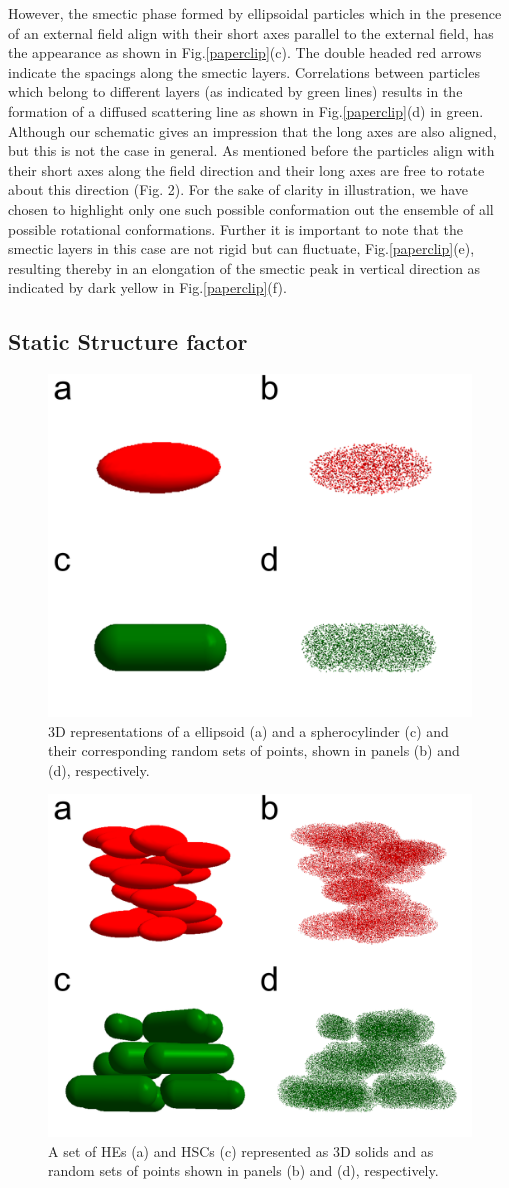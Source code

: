 \documentclass[aip,graphicx]{revtex4-1} %
\begin{document}
However, the smectic phase formed by ellipsoidal particles which in the presence of an external field align with their short axes parallel to the external
field, has the appearance as shown in Fig.\ref{paperclip}(c). The double headed red arrows indicate the spacings along the smectic layers. Correlations between
particles which belong to different layers (as indicated by green lines) results in the formation of a diffused scattering line as shown in
Fig.\ref{paperclip}(d) in green. Although our schematic gives an impression that the long axes are also aligned, but this is not the case in general. As
mentioned before the particles align with their short axes along the field direction and their long axes are free to rotate about this direction (Fig. 2). For
the sake of clarity in illustration, we have chosen to
highlight only one such possible conformation out the ensemble of all possible rotational conformations. Further it is important to note that the smectic layers
in this case are not rigid but can fluctuate, Fig.\ref{paperclip}(e), resulting thereby in an elongation of the smectic peak in vertical direction as indicated
by dark yellow in Fig.\ref{paperclip}(f).


\subsection{Static Structure factor}

\begin{figure}
    \centering
    \includegraphics[width=0.4\columnwidth]{Scatteringmodel_single.png}
    \caption{3D representations of a ellipsoid (a) and a spherocylinder (c) and their corresponding random sets of points, shown 
     in panels (b) and (d), respectively.}\label{fig:scatt_mod_single}
\end{figure}

\begin{figure}
    \centering
    \includegraphics[width=0.4\columnwidth]{Scatteringmodel1.png}
    \caption{A set of HEs (a) and HSCs (c) represented as 3D solids and as random sets of points 
    shown in panels (b) and (d), respectively.}\label{fig:scatt_mod1}
\end{figure}
\end{document}
